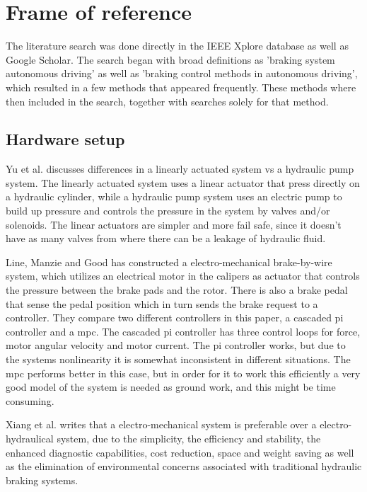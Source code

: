 \documentclass[a4paper,11pt]{kth-mag}
\begin{document}
\section{Frame of reference}
The literature search was done directly in the IEEE Xplore database as well as Google Scholar. The search began with broad definitions as 'braking system autonomous driving' as well as 'braking control methods in autonomous driving', which resulted in a few methods that appeared frequently. These methods where then included in the search, together with searches solely for that method.


\subsection{Hardware setup}
Yu et al. \cite{Yu} discusses differences in a linearly actuated system vs a hydraulic pump system. The linearly actuated system uses a linear actuator that press directly on a hydraulic cylinder, while a hydraulic pump system uses an electric pump to build up pressure and controls the pressure in the system by valves and/or solenoids. The linear actuators are simpler and more fail safe, since it doesn't have as many valves from where there can be a leakage of hydraulic fluid. 


\vspace{5mm}
Line, Manzie and Good \cite{4475522} has constructed a electro-mechanical  brake-by-wire system, which utilizes an electrical motor in the calipers as actuator that controls the pressure between the brake pads and the rotor. There is also a brake pedal that sense the pedal position which in turn sends the brake request to a controller. They compare two different controllers in this paper, a cascaded \gls{pi} controller and a \gls{mpc}. The cascaded \gls{pi} controller has three control loops for force, motor angular velocity and motor current. The \gls{pi} controller works, but due to the systems nonlinearity it is somewhat inconsistent in different situations. The \gls{mpc} performs better in this case, but in order for it to work this efficiently a very good model of the system is needed as ground work, and this might be time consuming. \newline


Xiang et al. \cite{Xiang} writes that a electro-mechanical system is preferable over a electro-hydraulical system, due to the simplicity, the efficiency and stability, the enhanced diagnostic capabilities, cost reduction, space and weight saving as well as the elimination of environmental concerns associated with traditional hydraulic braking systems.\newline
\end{document}
